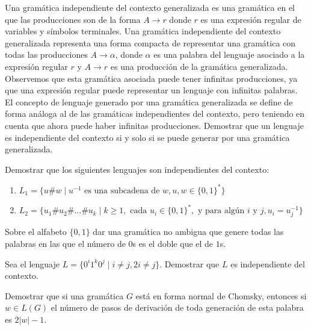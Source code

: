 \begin{ejercicio}\label{ej:1.4.15}
    Una gramática independiente del contexto generalizada es una gramática en el que las producciones son de la forma $A \rightarrow r$ donde $r$ es una expresión regular de variables y símbolos terminales. Una gramática independiente del contexto generalizada representa una forma compacta de representar una gramática con todas las producciones $A \rightarrow \alpha$, donde $\alpha$ es una palabra del lenguaje asociado a la expresión regular $r$ y $A \rightarrow r$ es una producción de la gramática generalizada. Observemos que esta gramática asociada puede tener infinitas producciones, ya que una expresión regular puede representar un lenguaje con infinitas palabras. El concepto de lenguaje generado por una gramática generalizada se define de forma análoga al de las gramáticas independientes del contexto, pero teniendo en cuenta que ahora puede haber infinitas producciones. Demostrar que un lenguaje es independiente del contexto si y solo si se puede generar por una gramática generalizada.
\end{ejercicio}

\begin{ejercicio}\label{ej:1.4.16}
    Demostrar que los siguientes lenguajes son independientes del contexto:
    \begin{enumerate}
        \item $L_1 = \{ u \# w \mid u^{-1} \text{ es una subcadena de } w, u, w \in \{ 0, 1 \}^* \}$
        \item $L_2 = \{ u_1 \# u_2 \# \ldots \# u_k \mid k \geq 1, \text{ cada } u_i \in \{ 0, 1 \}^*, \text{ y para algún } i \text{ y } j, u_i = u_j^{-1} \}$
    \end{enumerate}
\end{ejercicio}

\begin{ejercicio}\label{ej:1.4.17}
    Sobre el alfabeto $\{ 0, 1 \}$ dar una gramática no ambigua que genere todas las palabras en las que el número de $0$s es el doble que el de $1$s.
\end{ejercicio}

\begin{ejercicio}\label{ej:1.4.18}
    Sea el lenguaje $L = \{ 0^i 1^k 0^j \mid i \neq j, 2i \neq j \}$. Demostrar que $L$ es independiente del contexto.
\end{ejercicio}

\begin{ejercicio}\label{ej:1.4.19}
    Demostrar que si una gramática $G$ está en forma normal de Chomsky, entonces si $w \in L(G)$ el número de pasos de derivación de toda generación de esta palabra es $2|w| - 1$.
\end{ejercicio}


